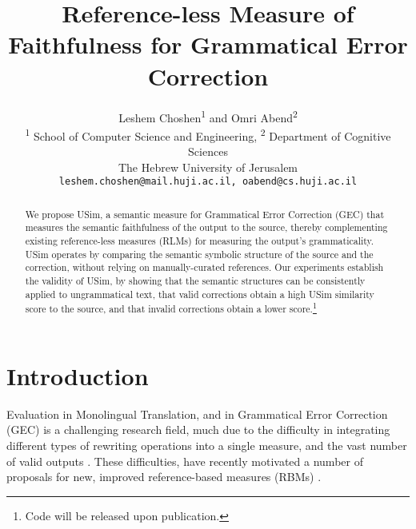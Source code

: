 \documentclass[a4paper, 11pt]{article}
\begin{document}
\title{Reference-less Measure of Faithfulness for Grammatical Error Correction}
\author{
  Leshem Choshen\textsuperscript{1} and Omri Abend\textsuperscript{2} \\
  \textsuperscript{1} School of Computer Science and Engineering,
  \textsuperscript{2} Department of Cognitive Sciences \\
  The Hebrew University of Jerusalem \\
  \texttt{leshem.choshen@mail.huji.ac.il, oabend@cs.huji.ac.il}\\
}
\maketitle

\begin{abstract}
  We propose {\sc USim}, a semantic measure for Grammatical Error Correction (GEC)
  that measures the semantic faithfulness of the output to the source,
  thereby complementing existing reference-less measures (RLMs) for measuring the output's grammaticality.
  {\sc USim} operates by comparing the semantic symbolic structure of the source and the correction,
	without relying on manually-curated references.
  Our experiments establish the validity of {\sc USim},
  by showing that the semantic structures can be consistently applied to ungrammatical text, that
  valid corrections obtain a high {\sc USim} similarity score to the source, and that
  invalid corrections obtain a lower score.\footnote{Code will be released upon publication.}
\end{abstract}


\section{Introduction}

Evaluation in Monolingual Translation, and in Grammatical Error Correction (GEC) is a challenging
research field, much due to the difficulty in integrating 
different types of rewriting operations into a single measure, and the vast number of valid outputs
\cite{tetreault2008native,madnani2011they,chodorow2012problems,bryant2015far}.
These difficulties, have recently motivated
a number of proposals for new, improved reference-based measures (RBMs)  \cite{dahlmeier2012better,felice2015towards,napoles2015ground}.
\end{document}
